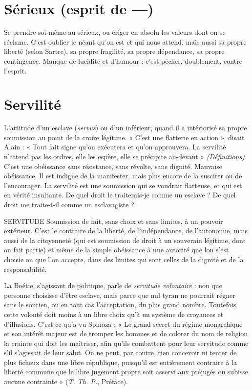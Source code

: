 \section{Sérieux (esprit de —)}
Se prendre soi-même au sérieux, ou ériger en
absolu les valeurs dont on se réclame. C’est
oublier le néant qu’on est et qui nous attend, mais aussi sa propre liberté (selon
Sartre), sa propre fragilité, sa propre dépendance, sa propre contingence.
Manque de lucidité et d'humour : c’est pécher, doublement, contre l'esprit.

\section{Servilité}
L’attitude d’un esclave ({\it servus}) ou d’un inférieur, quand il a
intériorisé sa propre soumission au point de la croire légitime.
« C’est une flatterie en action », disait Alain : « Tout fait signe qu’on exécutera
et qu'on approuvera. La servilité n'attend pas les ordres, elle les espère, elle se
précipite au-devant » {\it (Définitions)}. C’est une obéissance sans résistance, sans
révolte, sans dignité. Mauvaise obéissance. Il est indigne de la manifester, mais
plus encore de la susciter ou de l’encourager. La servilité est une soumission qui
se voudrait flatteuse, et qui est en vérité insultante. De quel droit le traiterais-je
comme un esclave ? De quel droit me traite-t-il comme un esclavagiste ?

SERVITUDE Soumission de fait, sans choix et sans limites, à un pouvoir
extérieur. C’est le contraire de la liberté, de l'indépendance, de
l'autonomie, mais aussi de la citoyenneté (qui est soumission de droit à un souverain
légitime, dont on fait partie) et même de la simple obéissance à une
autorité que lon s’est choisie ou que l’on accepte, dans des limites qui sont
celles de la dignité et de la responsabilité.

La Boétie, s'agissant de politique, parle de {\it servitude volontaire} : non que
personne choisisse d’être esclave, mais parce que nul tyran ne pourrait régner
sans le soutien, ou en tout cas l’acceptation, du plus grand nombre. Toutefois
cette volonté doit moins à un libre choix qu’à un système de croyances et d’illusions.
C’est ce qu’a vu Spinoza : « Le grand secret du régime monarchique et
son intérêt majeur est de tromper les hommes et de colorer du nom de religion
la crainte qui doit les maîtriser, afin qu’ils combattent pour leur servitude
comme s’il s'agissait de leur salut. On ne peut, par contre, rien concevoir ni
tenter de plus ficheux dans une libre république, puisqu'il est entièrement
contraire à la liberté commune que le libre jugement propre soit asservi aux
préjugés ou subisse aucune contrainte » ({\it T. Th. P.}, Préface).

